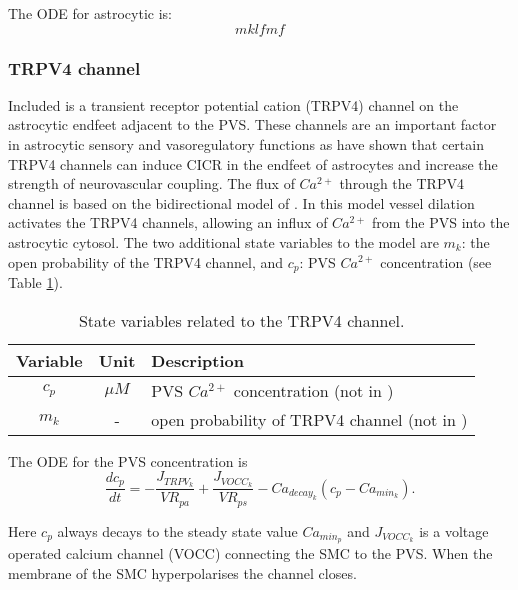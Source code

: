 	The ODE for astrocytic \ca is:
	\begin{equation}
	mklfmf
	\end{equation}
	
	\subsubsection{TRPV4 channel}
	
	Included is a transient receptor potential cation (TRPV4) channel on the astrocytic endfeet adjacent to the PVS.
	These channels are an important factor in astrocytic sensory and vasoregulatory functions as \cite{Dunn2013} have shown that certain TRPV4 channels can induce CICR in the endfeet of astrocytes and increase the strength of neurovascular coupling.
	The flux of $Ca^{2+}$ through the TRPV4 channel is based on the bidirectional model of \cite{Witthoft2012}.
	In this model vessel dilation activates the TRPV4 channels, allowing an influx of $Ca^{2+}$ from the PVS into the astrocytic cytosol. 
	The two additional state variables to the model are
	$m_k$: the open probability of the TRPV4 channel, and $c_p$: PVS $Ca^{2+}$ concentration (see Table \ref{tab:NVU12trpv4}).
			
					\begin{table}[h!]
						\small
						\centering
							\begin{tabular}{c c l}
						\hline
						Variable & Unit & Description \\
						\hline
						$c_p$ &  $\mu M$ & PVS $Ca^{2+}$  concentration (not in \cite{Farr2011}) \\
						$m_k$ & - & open probability of TRPV4 channel (not in \cite{Farr2011}) \\
						\hline
							\end{tabular}
							\caption{State variables related to the TRPV4 channel.}
							\label{tab:NVU12trpv4}
					\end{table}
					
			The ODE for the PVS \ca concentration is
				\begin{equation}
				\frac{d c_p}{dt} = - \frac{J_{TRPV_k}}{VR_{pa}} + \frac{J_{VOCC_k}}{VR_{ps}} - Ca_{decay_k} ( c_p - Ca_{min_k} ).
				\end{equation}
			
			Here $c_p$ always decays to the steady state value $Ca_{min_p}$ and $J_{VOCC_k}$ is a voltage operated calcium channel (VOCC) connecting the SMC to the PVS. When the membrane of the SMC hyperpolarises the channel closes. 
					

